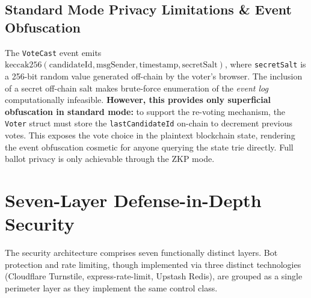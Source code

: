 \documentclass[conference]{IEEEtran}
\begin{document}
\subsection{Standard Mode Privacy Limitations \& Event Obfuscation}
The \texttt{VoteCast} event emits $\text{keccak256}(\text{candidateId}, \text{msgSender}, \text{timestamp}, \text{secretSalt})$, where \texttt{secretSalt} is a 256-bit random value generated off-chain by the voter's browser. The inclusion of a secret off-chain salt makes brute-force enumeration of the \emph{event log} computationally infeasible. \textbf{However, this provides only superficial obfuscation in standard mode:} to support the re-voting mechanism, the \texttt{Voter} struct must store the \texttt{lastCandidateId} on-chain to decrement previous votes. This exposes the vote choice in the plaintext blockchain state, rendering the event obfuscation cosmetic for anyone querying the state trie directly. Full ballot privacy is only achievable through the ZKP mode.

\section{Seven-Layer Defense-in-Depth Security}

The security architecture comprises seven functionally distinct layers. Bot protection and rate limiting, though implemented via three distinct technologies (Cloudflare Turnstile, express-rate-limit, Upstash Redis), are grouped as a single perimeter layer as they implement the same control class.
\end{document}
